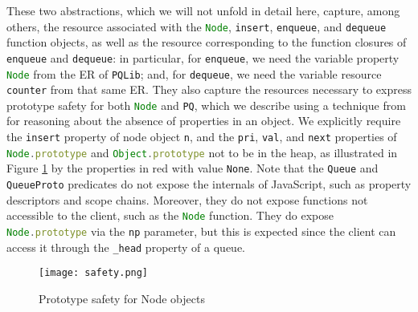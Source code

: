 \documentclass{llncs}
\def\jsinline{\lstinline[language=JavaScript, basicstyle=\small]}
\begin{document}
These two abstractions, which we will not unfold in detail here,
capture, among others, the resource associated with the \jsinline|Node|,
\jsinline|insert|, \jsinline|enqueue|, and \jsinline|dequeue| function
objects, as well as the resource
corresponding to the function closures of \jsinline|enqueue| and
\jsinline|dequeue|:  in particular, for \jsinline|enqueue|, we need the
variable property \jsinline|Node| from the ER of \jsinline|PQLib|;
and,  for \jsinline|dequeue|, we need the variable resource
\jsinline|counter| from that same ER. They also capture the resources
necessary to express prototype safety for both \jsinline|Node| and
\jsinline|PQ|, which we describe using a technique from
\cite{gardner:popl:2012} for reasoning about the absence of properties
in an object. We explicitly require the \jsinline|insert| property of
node object \jsinline|n|, and the \jsinline|pri|, \jsinline|val|, and
\jsinline|next| properties of \jsinline|Node.prototype| and \jsinline|Object.prototype| not to be in the heap, as illustrated in Figure \ref{fig:runex:heap} by the properties in red with value \jsinline|None|.
Note that the \jsinline|Queue| and \jsinline|QueueProto| predicates do
not expose the internals of JavaScript, such as property descriptors
and scope chains. Moreover, they do not expose functions not
accessible to the client, such as the \jsinline|Node| function. They
do expose \jsinline|Node.prototype| via the \jsinline|np| parameter,
but this is expected since the
client  can access it through the \jsinline|_head| property of a queue.

\vspace*{-0.2cm}
\begin{figure}[!h]
\texttt{[image: safety.png]}
\caption{Prototype safety for Node objects}
\label{fig:runex:heap}
\vspace*{-0.5cm}
\end{figure}
\end{document}
